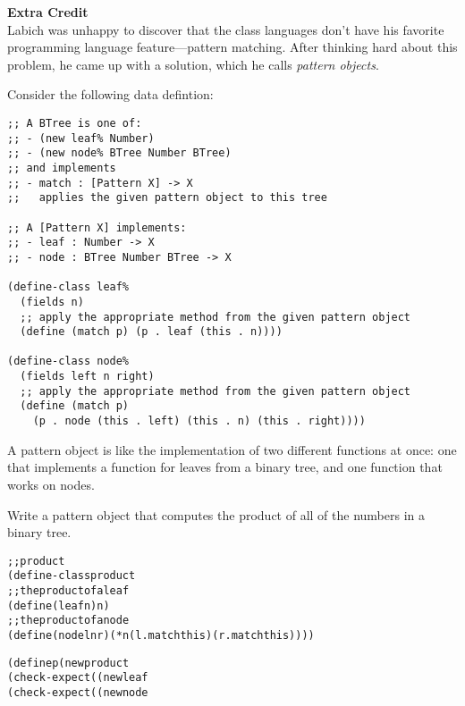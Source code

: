 \documentclass[12pt]{article}                   %
\def\pts#1{\marginpar{\footnotesize \raggedright  \fbox{#1 {\sc Points}}}}
\newenvironment{solution}{\color{Red}}{}
\begin{document}
\begin{problem}\pts{5}


\textbf{Extra Credit}
\\
\noindent
Labich was unhappy to discover that the class languages don't have his
favorite programming language feature---pattern matching.  After
thinking hard about this problem, he came up with a solution, which he
calls \emph{pattern objects}.  

Consider the following data defintion:
\begin{verbatim}
;; A BTree is one of:
;; - (new leaf% Number)
;; - (new node% BTree Number BTree)
;; and implements
;; - match : [Pattern X] -> X
;;   applies the given pattern object to this tree

;; A [Pattern X] implements:
;; - leaf : Number -> X
;; - node : BTree Number BTree -> X

(define-class leaf%
  (fields n)
  ;; apply the appropriate method from the given pattern object
  (define (match p) (p . leaf (this . n))))

(define-class node%
  (fields left n right)
  ;; apply the appropriate method from the given pattern object
  (define (match p) 
    (p . node (this . left) (this . n) (this . right))))
\end{verbatim}

A pattern object is like the implementation of two different functions
at once: one that implements a function for leaves from a binary tree,
and one function that works on nodes.

Write a pattern object that computes the product of all of the numbers
in a binary tree.

\newpage
\ifrubric{}
\fi


\begin{solution}
\begin{alltt}
;; product% implements [Pattern Number]
(define-class product%
  ;; the product of a leaf
  (define (leaf n) n)
  ;; the product of a node
  (define (node l n r) (* n (l . match this) (r . match this))))

(define p (new product%))
(check-expect ((new leaf% 5) . match p) 5)
(check-expect ((new node%  (new leaf% 2) 5 (new leaf% 7)) . match p) 70)
\end{alltt}
\end{solution}
\end{problem}
\end{document}
